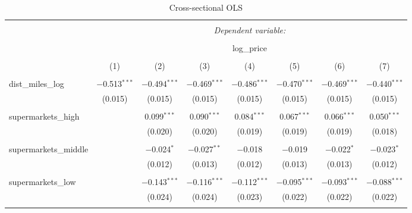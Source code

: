 \documentclass{article}
\begin{document}
\begin{table}[H] \centering 
  \caption{Cross-sectional OLS} 
  \label{} 
\small 
\begin{tabular}{@{\extracolsep{-10pt}}lccccccc} 
\\[-1.8ex]\hline 
\hline \\[-1.8ex] 
 & \multicolumn{7}{c}{\textit{Dependent variable:}} \\ 
\cline{2-8} 
\\[-1.8ex] & \multicolumn{7}{c}{log\_price} \\ 
\\[-1.8ex] & (1) & (2) & (3) & (4) & (5) & (6) & (7)\\ 
\hline \\[-1.8ex] 
 dist\_miles\_log & $-$0.513$^{***}$ & $-$0.494$^{***}$ & $-$0.469$^{***}$ & $-$0.486$^{***}$ & $-$0.470$^{***}$ & $-$0.469$^{***}$ & $-$0.440$^{***}$ \\ 
  & (0.015) & (0.015) & (0.015) & (0.015) & (0.015) & (0.015) & (0.015) \\ 
  & & & & & & & \\ 
 supermarkets\_high &  & 0.099$^{***}$ & 0.090$^{***}$ & 0.084$^{***}$ & 0.067$^{***}$ & 0.066$^{***}$ & 0.050$^{***}$ \\ 
  &  & (0.020) & (0.020) & (0.019) & (0.019) & (0.019) & (0.018) \\ 
  & & & & & & & \\ 
 supermarkets\_middle &  & $-$0.024$^{*}$ & $-$0.027$^{**}$ & $-$0.018 & $-$0.019 & $-$0.022$^{*}$ & $-$0.023$^{*}$ \\ 
  &  & (0.012) & (0.013) & (0.012) & (0.013) & (0.013) & (0.012) \\ 
  & & & & & & & \\ 
 supermarkets\_low &  & $-$0.143$^{***}$ & $-$0.116$^{***}$ & $-$0.112$^{***}$ & $-$0.095$^{***}$ & $-$0.093$^{***}$ & $-$0.088$^{***}$ \\ 
  &  & (0.024) & (0.024) & (0.023) & (0.022) & (0.022) & (0.022) \\ 
  & & & & & & & \\ 

\end{tabular}
\end{table}
\end{document}
